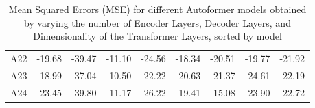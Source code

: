 \begin{table}[]
{\begin{tabular}{ccccccccc}
    A22   & \cellcolor[HTML]{F8E983}-19.68 & \cellcolor[HTML]{7EC57C}-39.47 & \cellcolor[HTML]{FFDD82}-11.10 & \cellcolor[HTML]{D1DD81}-24.56 & \cellcolor[HTML]{D5DF81}-18.34 & \cellcolor[HTML]{FFE182}-20.51 & \cellcolor[HTML]{FFEB84}-19.77 & \cellcolor[HTML]{FFE984}-21.92 \\
    A23   & \cellcolor[HTML]{FFDC82}-18.99 & \cellcolor[HTML]{FDBF7C}-37.04 & \cellcolor[HTML]{F8696B}-10.50 & \cellcolor[HTML]{FCA878}-22.22 & \cellcolor[HTML]{63BE7B}-20.63 & \cellcolor[HTML]{ECE582}-21.37 & \cellcolor[HTML]{63BE7B}-24.61 & \cellcolor[HTML]{CCDC81}-22.19 \\
    A24   & \cellcolor[HTML]{9BCE7E}-23.45 & \cellcolor[HTML]{63BE7B}-39.80 & \cellcolor[HTML]{FFE984}-11.17 & \cellcolor[HTML]{63BE7B}-26.22 & \cellcolor[HTML]{9FCF7E}-19.41 & \cellcolor[HTML]{F8696B}-15.08 & \cellcolor[HTML]{79C47C}-23.90 & \cellcolor[HTML]{63BE7B}-22.72
    \end{tabular}%
    }
    \caption{Mean Squared Errors (MSE) for different Autoformer models obtained by varying the number of Encoder Layers, Decoder Layers, and Dimensionality of the Transformer Layers, sorted by model}
    \label{A4_M}
    \end{table}



